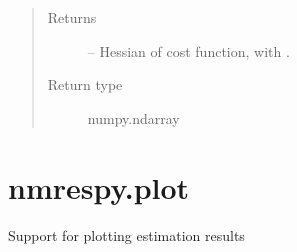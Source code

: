 \documentclass[letterpaper,10pt,english]{sphinxmanual}
\begin{document}
\begin{fulllineitems}
\begin{quote}
\begin{description}
\begin{itemize}
\begin{itemize}
\end{itemize}


\end{itemize}

\item[{Returns}] \leavevmode
\sphinxAtStartPar
{} – Hessian of cost function, with .

\item[{Return type}] \leavevmode
\sphinxAtStartPar
numpy.ndarray

\end{description}\end{quote}

\end{fulllineitems}





\section{nmrespy.plot}
\label{\detokenize{references/plot:module-nmrespy.plot}}\label{\detokenize{references/plot:nmrespy-plot}}\label{\detokenize{references/plot::doc}}
\sphinxAtStartPar
Support for plotting estimation results
\end{document}
